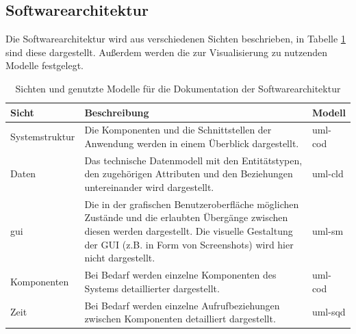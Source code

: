 \documentclass[a4paper,11pt,listof=numbered,glossary=totoc,parskip=half,toc=bib]{scrreprt}
\begin{document}
	\subsection{Softwarearchitektur}
	\label{subsec:softwarearchitektur}
	Die Softwarearchitektur wird aus verschiedenen Sichten beschrieben, in Tabelle \ref{tab:softwarearchitektur} sind diese dargestellt. Außerdem werden die zur Visualisierung zu nutzenden Modelle festgelegt.
	
	\begin{table}
		\centering
		\begin{tabularx}{\textwidth}{lXl}
			\toprule
			\textbf{Sicht} & \textbf{Beschreibung} & \textbf{Modell} \\
			\midrule
			Systemstruktur & Die Komponenten und die Schnittstellen der Anwendung werden in einem Überblick dargestellt. & \Gls{uml}-cod \\
			Daten & Das technische Datenmodell mit den Entitätstypen, den zugehörigen Attributen und den Beziehungen untereinander wird dargestellt.  & \Gls{uml}-cld \\
			\Gls{gui} & Die in der grafischen Benutzeroberfläche möglichen Zustände und die erlaubten Übergänge zwischen diesen werden dargestellt. Die visuelle Gestaltung der GUI (z.B. in Form von Screenshots) wird hier nicht dargestellt. & \Gls{uml}-sm\\
			Komponenten & Bei Bedarf werden einzelne Komponenten des Systems detaillierter dargestellt. & \Gls{uml}-cod \\
			Zeit & Bei Bedarf werden einzelne Aufrufbeziehungen zwischen Komponenten detailliert dargestellt. & \Gls{uml}-sqd \\
			\bottomrule
		\end{tabularx}
		\caption{Sichten und genutzte Modelle für die Dokumentation der Softwarearchitektur}
		\label{tab:softwarearchitektur}
	\end{table}	
	
	
\end{document}
